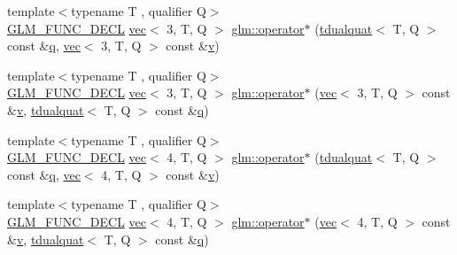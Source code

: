 \begin{DoxyCompactItemize}
\item 
{\footnotesize template$<$typename T , qualifier Q$>$ }\\\mbox{\hyperlink{setup_8hpp_ab2d052de21a70539923e9bcbf6e83a51}{G\+L\+M\+\_\+\+F\+U\+N\+C\+\_\+\+D\+E\+CL}} \mbox{\hyperlink{structglm_1_1vec}{vec}}$<$ 3, T, Q $>$ \mbox{\hyperlink{group__gtx__dual__quaternion_ga3489c5fcf23fd302ef3713f443585cbd}{glm\+::operator$\ast$}} (\mbox{\hyperlink{structglm_1_1tdualquat}{tdualquat}}$<$ T, Q $>$ const \&\mbox{\hyperlink{_s_d_l__opengl_8h_a8fc1e7b9baaae687804c7eed46ca09c6}{q}}, \mbox{\hyperlink{structglm_1_1vec}{vec}}$<$ 3, T, Q $>$ const \&\mbox{\hyperlink{_s_d_l__opengl_8h_a10a82eabcb59d2fcd74acee063775f90}{v}})
\item 
{\footnotesize template$<$typename T , qualifier Q$>$ }\\\mbox{\hyperlink{setup_8hpp_ab2d052de21a70539923e9bcbf6e83a51}{G\+L\+M\+\_\+\+F\+U\+N\+C\+\_\+\+D\+E\+CL}} \mbox{\hyperlink{structglm_1_1vec}{vec}}$<$ 3, T, Q $>$ \mbox{\hyperlink{group__gtx__dual__quaternion_ga84dc00cb210525a28d3a185c9a0ba176}{glm\+::operator$\ast$}} (\mbox{\hyperlink{structglm_1_1vec}{vec}}$<$ 3, T, Q $>$ const \&\mbox{\hyperlink{_s_d_l__opengl_8h_a10a82eabcb59d2fcd74acee063775f90}{v}}, \mbox{\hyperlink{structglm_1_1tdualquat}{tdualquat}}$<$ T, Q $>$ const \&\mbox{\hyperlink{_s_d_l__opengl_8h_a8fc1e7b9baaae687804c7eed46ca09c6}{q}})
\item 
{\footnotesize template$<$typename T , qualifier Q$>$ }\\\mbox{\hyperlink{setup_8hpp_ab2d052de21a70539923e9bcbf6e83a51}{G\+L\+M\+\_\+\+F\+U\+N\+C\+\_\+\+D\+E\+CL}} \mbox{\hyperlink{structglm_1_1vec}{vec}}$<$ 4, T, Q $>$ \mbox{\hyperlink{group__gtx__dual__quaternion_ga5e415497e00977106ec263f86b61e84c}{glm\+::operator$\ast$}} (\mbox{\hyperlink{structglm_1_1tdualquat}{tdualquat}}$<$ T, Q $>$ const \&\mbox{\hyperlink{_s_d_l__opengl_8h_a8fc1e7b9baaae687804c7eed46ca09c6}{q}}, \mbox{\hyperlink{structglm_1_1vec}{vec}}$<$ 4, T, Q $>$ const \&\mbox{\hyperlink{_s_d_l__opengl_8h_a10a82eabcb59d2fcd74acee063775f90}{v}})
\item 
{\footnotesize template$<$typename T , qualifier Q$>$ }\\\mbox{\hyperlink{setup_8hpp_ab2d052de21a70539923e9bcbf6e83a51}{G\+L\+M\+\_\+\+F\+U\+N\+C\+\_\+\+D\+E\+CL}} \mbox{\hyperlink{structglm_1_1vec}{vec}}$<$ 4, T, Q $>$ \mbox{\hyperlink{group__gtx__dual__quaternion_ga9fd4e646fe49daed7aabbf0cb8736685}{glm\+::operator$\ast$}} (\mbox{\hyperlink{structglm_1_1vec}{vec}}$<$ 4, T, Q $>$ const \&\mbox{\hyperlink{_s_d_l__opengl_8h_a10a82eabcb59d2fcd74acee063775f90}{v}}, \mbox{\hyperlink{structglm_1_1tdualquat}{tdualquat}}$<$ T, Q $>$ const \&\mbox{\hyperlink{_s_d_l__opengl_8h_a8fc1e7b9baaae687804c7eed46ca09c6}{q}})

\end{DoxyCompactItemize}

